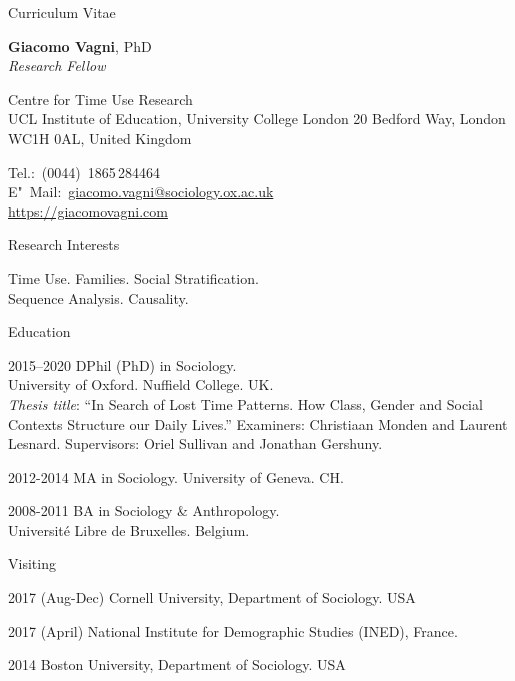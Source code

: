 \documentclass[12pt,a4paper]{article}
\begin{document}
\begin{cv}{Curriculum Vitae}
  \begin{cvlist}{}
  \item \textbf{Giacomo Vagni}, PhD\\
  \emph{Research Fellow}
   
   \item Centre for Time Use Research \\
    UCL Institute of Education, University College London
    20 Bedford Way, London WC1H 0AL, United Kingdom
  \item Tel.:~(0044)~1865\,284464\\
    E"~Mail:~\href{mailto:giacomo.vagni@sociology.ox.ac.uk}{giacomo.vagni@sociology.ox.ac.uk} \\ 
    \href{https://giacomovagni.com} {https://giacomovagni.com} \\
   \end{cvlist}
  
  \begin{cvlist}{Research Interests}
  \item[] Time Use. Families. Social Stratification. \\  Sequence Analysis. Causality. 
  \end{cvlist}
  
  \begin{cvlist}{Education}
  \item[2015--2020] DPhil (PhD) in Sociology. \\ University of Oxford. Nuffield College. UK. \\ \emph{Thesis title}: ``In Search of Lost Time Patterns. How Class, Gender and Social Contexts Structure our Daily Lives.'' Examiners: Christiaan Monden and Laurent Lesnard. Supervisors: Oriel Sullivan and Jonathan Gershuny.
  
  \item[2012-2014] MA in Sociology. University of Geneva. CH. 
  \item[2008-2011] BA in Sociology \& Anthropology. \\ Universit{\'e} Libre de Bruxelles. Belgium. 
  \end{cvlist}
  
      \begin{cvlist}{Visiting}
      	\item[2017 (Aug-Dec)] Cornell University, Department of Sociology. USA 
      	\item[2017 (April)] National Institute for Demographic Studies (INED), France. 
      	\item[2014] Boston University, Department of Sociology. USA
      \end{cvlist}
      

\end{cv}
\end{document}
